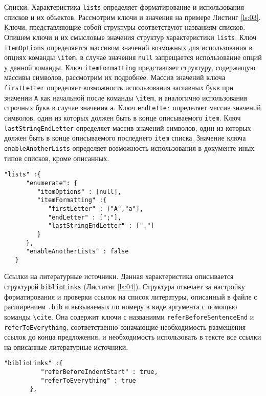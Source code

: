     Списки. Характеристика \verb|lists| определяет форматирование и использования списков и их объектов.  Рассмотрим ключи и значения на примере Листинг \ref{ls:03}. Ключи, представляющие собой структуры соответствуют названиям списков. Опишем ключи и их смысловые значения структур характеристики \verb|lists|. Ключ \verb|itemOptions| определяется массивом значений возможных для использования в опциях команды \verb|\item|, в случае значения \verb|null| запрещается использование опций у данной команды. Ключ \verb|itemFormatting| представляет структуру, содержащую массивы символов, рассмотрим их подробнее. Массив значений ключа \verb|firstLetter| определяет возможность использования заглавных букв при значении \verb|A| как начальной после команды \verb|\item|, и аналогично использования строчных букв в случае значения \verb|a|. Ключ \verb|endLetter| определяет массив значений символов, один из которых должен быть в конце описываемого \verb|item|. Ключ \verb|lastStringEndLetter| определяет массив значений символов, один из которых должен быть в конце описываемого последнего \verb|item| списка. Значение ключа \verb|enableAnotherLists| определяет возможность использования в документе иных типов списков, кроме описанных. 
    \begin{lstlisting}[caption = {Пример конфигурации списков},label={ls:04}]
    "lists" :{
      "enumerate": {
         "itemOptions" : [null],
         "itemFormatting" :{
            "firstLetter" : ["A","a"],
            "endLetter" : [";"],
            "lastStringEndLetter" : ["."]
         }
      },
      "enableAnotherLists" : false   
   }
    \end{lstlisting}

    Ссылки на литературные источники. Данная характеристика описывается структурой \verb|biblioLinks| (Листитнг \ref{ls:04}). Структура отвечает за настройку форматирования и проверки ссылок на список литературы, описанный в файле с расширением \verb|.bib| и вызываемых по номеру в виде аргумента с помощью команды \verb|\cite|. Она содержит ключи с названиями  \verb|referBeforeSentenceEnd| и \verb|referToEverything|, соответственно означающие необходимость размещения ссылок до конца предложения, и необходимость использовать в тексте все ссылки на описанные литературные источники.
    
    \begin{lstlisting}[caption = {Пример конфигурации ссылок на литературные источники}, label={ls:04}]
    "biblioLinks" :{
          "referBeforeIndentStart" : true,
          "referToEverything" : true
       },
     \end{lstlisting}   

